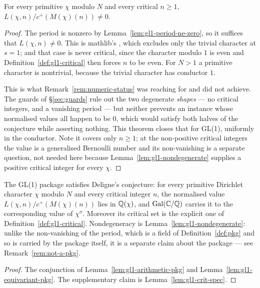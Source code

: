 \begin{theorem}
  \label{thm:gl1-nonvanishing}
  \leanok
  For every primitive $\chi$ modulo $N$ and every critical $n \geq 1$,
  $L(\chi,n)/c^{+}(M(\chi)(n)) \neq 0$.
\end{theorem}
\begin{proof}
  \leanok
  The period is nonzero by Lemma~\ref{lem:gl1-period-ne-zero}, so it suffices that
  $L(\chi,n) \neq 0$. This is mathlib's
  , which excludes only the
  trivial character at $s = 1$; and that case is never critical, since the character modulo
  $1$ is even and Definition~\ref{def:gl1-critical} then forces $n$ to be even. For $N > 1$ a
  primitive character is nontrivial, because the trivial character has conductor $1$.

  This is what Remark~\ref{rem:numeric-status} was reaching for and did not achieve. The
  guards of \S\ref{sec:guards} rule out the two degenerate \emph{shapes} --- no critical
  integers, and a vanishing period --- but neither prevents an instance whose normalised
  values all happen to be $0$, which would satisfy both halves of the conjecture while
  asserting nothing. This theorem closes that for GL(1), uniformly in the conductor. Note it
  covers only $n \geq 1$; at the non-positive critical integers the value is a generalised
  Bernoulli number and its non-vanishing is a separate question, not needed here because
  Lemma~\ref{lem:gl1-nondegenerate} supplies a positive critical integer for every $\chi$.
\end{proof}

\begin{theorem}
  \label{thm:gl1-main}
  \leanok
  The GL(1) package satisfies Deligne's conjecture: for every primitive Dirichlet
  character $\chi$ modulo $N$ and every critical integer $n$, the normalised value
  $L(\chi,n)/c^{+}(M(\chi)(n))$ lies in $\mathbb{Q}(\chi)$, and $\operatorname{Gal}(\mathbb{C}/\mathbb{Q})$
  carries it to the corresponding value of $\chi^{\sigma}$. Moreover its critical set is the
  explicit one of Definition~\ref{def:gl1-critical}. Nondegeneracy is
  Lemma~\ref{lem:gl1-nondegenerate}: unlike the non-vanishing of the period, which is a field of
  Definition~\ref{def:pkg} and so is carried by the package itself, it is a separate claim
  about the package --- see Remark~\ref{rem:not-a-pkg}.
\end{theorem}
\begin{proof}
  \leanok
  The conjunction of Lemma~\ref{lem:gl1-arithmetic-pkg} and
  Lemma~\ref{lem:gl1-equivariant-pkg}. The supplementary claim is
  Lemma~\ref{lem:gl1-crit-spec}.
\end{proof}
